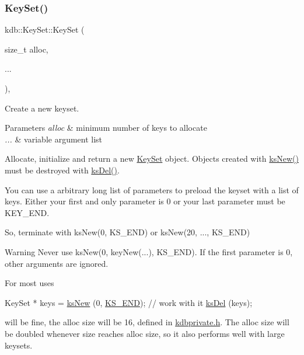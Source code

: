 \subsubsection{\texorpdfstring{Key\+Set()}{KeySet()}\hspace{0.1cm}{\footnotesize\ttfamily [4/5]}}
{\footnotesize\ttfamily kdb\+::\+Key\+Set\+::\+Key\+Set (\begin{DoxyParamCaption}\item[{size\+\_\+t}]{alloc,  }\item[{}]{... }\end{DoxyParamCaption})\hspace{0.3cm}{\ttfamily [inline]}, {\ttfamily [explicit]}}



Create a new keyset. 


\begin{DoxyParams}{Parameters}
{\em alloc} & minimum number of keys to allocate \\
\hline
{\em ...} & variable argument list\\
\hline
\end{DoxyParams}
Allocate, initialize and return a new \hyperlink{classkdb_1_1KeySet}{Key\+Set} object. Objects created with \hyperlink{group__keyset_ga671e1aaee3ae9dc13b4834a4ddbd2c3c}{ks\+New()} must be destroyed with \hyperlink{group__keyset_ga27e5c16473b02a422238c8d970db7ac8}{ks\+Del()}.

You can use a arbitrary long list of parameters to preload the keyset with a list of keys. Either your first and only parameter is 0 or your last parameter must be K\+E\+Y\+\_\+\+E\+ND.

So, terminate with ks\+New(0, K\+S\+\_\+\+E\+N\+D) or ks\+New(20, ..., K\+S\+\_\+\+E\+ND)

\begin{DoxyWarning}{Warning}
Never use ks\+New(0, key\+New(...), K\+S\+\_\+\+E\+ND). If the first parameter is 0, other arguments are ignored.
\end{DoxyWarning}
For most uses


\begin{DoxyCodeInclude}
KeySet * keys = \hyperlink{group__keyset_ga671e1aaee3ae9dc13b4834a4ddbd2c3c}{ksNew} (0, \hyperlink{kdbenum_8c_a7a28fce3773b2c873c94ac80b8b4cd54}{KS\_END});
\textcolor{comment}{// work with it}
\hyperlink{group__keyset_ga27e5c16473b02a422238c8d970db7ac8}{ksDel} (keys);
\end{DoxyCodeInclude}
 will be fine, the alloc size will be 16, defined in \hyperlink{kdbprivate_8h}{kdbprivate.\+h}. The alloc size will be doubled whenever size reaches alloc size, so it also performs well with large keysets.

